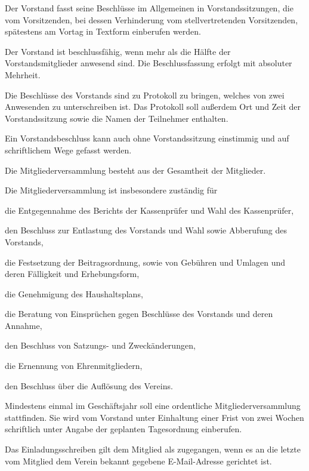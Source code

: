 \begin{contract}
	
 Der Vorstand fasst seine Beschlüsse im Allgemeinen in Vorstandssitzungen, die vom Vorsitzenden, bei dessen Verhinderung vom stellvertretenden Vorsitzenden, spätestens am Vortag in Textform einberufen werden. 
	
 Der Vorstand ist beschlussfähig, wenn mehr als die Hälfte der Vorstandsmitglieder anwesend sind. Die Beschlussfassung erfolgt mit absoluter Mehrheit.
	
 Die Beschlüsse des Vorstands sind zu Protokoll zu bringen, welches von zwei Anwesenden zu unterschreiben ist. Das Protokoll soll außerdem Ort und Zeit der Vorstandssitzung sowie die Namen der Teilnehmer enthalten.
	
 Ein Vorstandsbeschluss kann auch ohne Vorstandssitzung einstimmig und auf schriftlichem Wege gefasst werden.

	
 Die Mitgliederversammlung besteht aus der Gesamtheit der Mitglieder. 
	
 Die Mitgliederversammlung ist insbesondere zuständig für
	\begin{subpara}
		\item die Entgegennahme des Berichts der Kassenprüfer und Wahl des Kassenprüfer,
		\item den Beschluss zur Entlastung des Vorstands und Wahl sowie Abberufung des Vorstands,
		\item die Festsetzung der Beitragsordnung, sowie von Gebühren und Umlagen und deren Fälligkeit und Erhebungsform,
		\item die Genehmigung des Haushaltsplans,
		\item die Beratung von Einsprüchen gegen Beschlüsse des Vorstands und deren Annahme,
		\item den Beschluss von Satzungs- und Zweckänderungen,
		\item die Ernennung von Ehrenmitgliedern,
		\item den Beschluss über die Auflösung des Vereins.
	\end{subpara}
	
 Mindestens einmal im Geschäftsjahr soll eine ordentliche Mitgliederversammlung stattfinden. Sie wird vom Vorstand unter Einhaltung einer Frist von zwei Wochen schriftlich unter Angabe der geplanten Tagesordnung einberufen.
	
 Das Einladungsschreiben gilt dem Mitglied als zugegangen, wenn es an die letzte vom Mitglied dem Verein bekannt gegebene E-Mail-Adresse gerichtet ist.
	

\end{contract}
